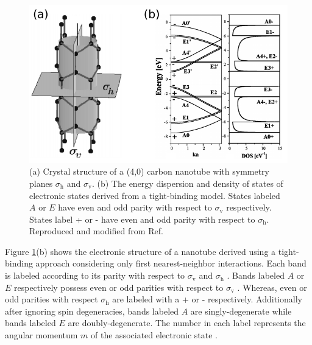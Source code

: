 \begin{figure}[ht]
	\centering
	\includegraphics[scale=1.2]{images/chapter_optical_props/cnt_symmetry_2_bozovic}
	\caption{(a) Crystal structure of a (4,0) carbon nanotube with symmetry planes $\sigma_\text{h}$ and $\sigma_\text{v}$. %
	(b) The energy dispersion and density of states of electronic states derived from a tight-binding model. States labeled $A$ or $E$ have even and odd parity with respect to $\sigma_\text{v}$ respectively. States label + or - have even and odd parity with respect to $\sigma_\text{h}$.  Reproduced and modified from Ref.\ \cite{bovzovic2000optical} }
	\label{fig:cnt_symmetries}
\end{figure}


Figure \ref{fig:cnt_symmetries}(b) shows the electronic structure of a nanotube derived using a tight-binding approach considering only first nearest-neighbor interactions. Each band is labeled according to its parity with respect to  $\sigma_\text{v}$ and $\sigma_\text{h}$ \cite{bovzovic2000optical}. Bands labeled $A$ or $E$ respectively possess even or odd parities with respect to $\sigma_\text{v}$ \cite{bovzovic2000optical}. Whereas, even or odd parities with respect $\sigma_\text{h}$ are labeled with a + or - respectively. Additionally after ignoring spin degeneracies, bands labeled $A$ are singly-degenerate while bands labeled $E$ are doubly-degenerate. The number in each label represents the angular momentum $m$ of the associated electronic state \cite{bovzovic2000optical}.

